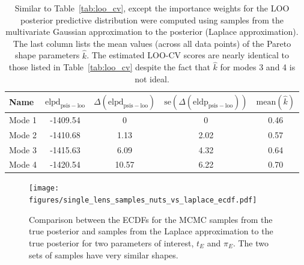 \documentclass[12pt,dvipsnames]{report}
\begin{document}
\begin{table}[h!]
\centering
\begin{tabular}{l  c c c c} 
 \toprule
Name &  $\mathrm{elpd}_\mathrm{psis-loo}$ & $\Delta(\mathrm{elpd}_\mathrm{psis-loo})$ & $\mathrm{se}(\Delta(\mathrm{eldp}_\mathrm{psis-loo}))$ & $\mathrm{mean}(\hat k)$\\
 \midrule
 Mode 1 & -1409.54 & 0 & 0 & 0.46\\
 Mode 2 & -1410.68 & 1.13 & 2.02 & 0.57\\
 Mode 3 & -1415.63 &  6.09 & 4.32 & 0.64\\
 Mode 4 & -1420.54 &  10.57	& 6.22 & 0.70\\
\bottomrule
\end{tabular}
\caption{Similar to Table~\ref{tab:loo_cv}, except the importance weights for the LOO
posterior predictive distribution were computed using samples from the multivariate 
Gaussian approximation to the posterior (Laplace approximation). The last column lists 
the mean values (across all data points) of the Pareto shape parameters $\hat k$.
The estimated LOO-CV scores are nearly identical to those listed in 
Table~\ref{tab:loo_cv} despite the fact that $\hat k$ for modes 3 and 4 is not ideal.}
\label{tab:loo_cv_laplace}
\end{table}

\begin{figure}[t]
    \begin{centering}
        \texttt{[image: figures/single\_lens\_samples\_nuts\_vs\_laplace\_ecdf.pdf]}
        \caption{
            Comparison between the ECDFs for the MCMC samples from the true posterior 
            and samples from the Laplace approximation to the true posterior for 
            two parameters of interest, $t_E$ and $\pi_E$. The two sets of samples 
            have very similar shapes. 
        }
            \label{fig:ogle_lightcurve_fit_nuts_vs_laplace_ecdf}
    \end{centering}
\end{figure}
\end{document}
